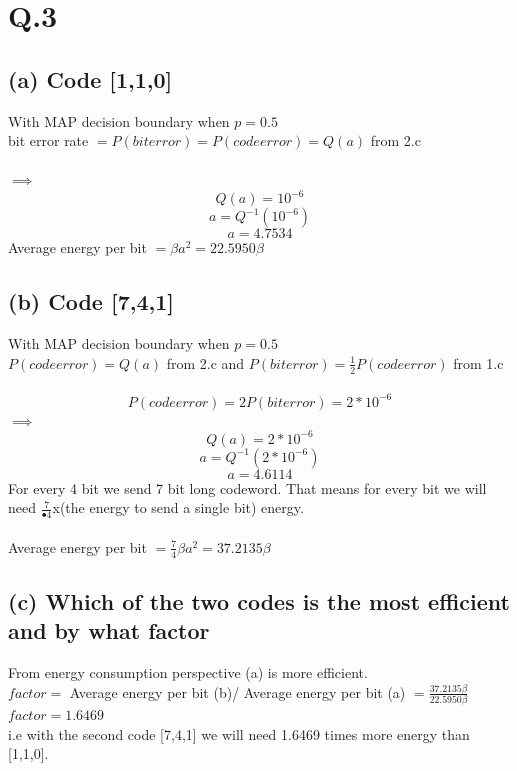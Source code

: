 \documentclass[a4paper,11pt]{article}
\begin{document}
\section*{Q.3}
\subsection*{(a) Code [1,1,0]}
With MAP decision boundary when $p = 0.5$ \\
bit error rate  $= P(biterror)=P(codeerror) =Q(a)$ from 2.c\\\\
$\implies$\\
$$Q(a) = 10^{-6}$$
$$a = Q^{-1}(10^{-6})$$
$$a =4.7534$$
Average energy per bit $= \beta a^2=22.5950\beta$
\subsection*{(b) Code [7,4,1]}
With MAP decision boundary when $p = 0.5$ \\
$P(codeerror) =Q(a)$ from 2.c and $P(biterror) = \frac{1}{2}P(codeerror)$ from 1.c \\\\
$$P(codeerror) = 2P(biterror) = 2*10^{-6}$$
$\implies$\\
$$Q(a) = 2*10^{-6}$$
$$a = Q^{-1}(2*10^{-6})$$
$$a =4.6114$$
For every 4 bit we send 7 bit long codeword. That means for every bit we will need
$\frac{7}{•4}$x(the energy to send a single bit) energy.\\\\
Average energy per bit $= \frac{7}{4}\beta a^2=37.2135\beta$
\subsection*{(c) Which of the two codes is the most efficient and by what factor}
From energy consumption perspective (a) is more efficient.\\
$factor =$ Average energy per bit (b)/ Average energy per bit (a) $=\frac{37.2135\beta}{22.5950\beta}$\\
$factor =1.6469$\\
i.e with the second code [7,4,1] we will need 1.6469 times more energy than [1,1,0]. 
\end{document}
